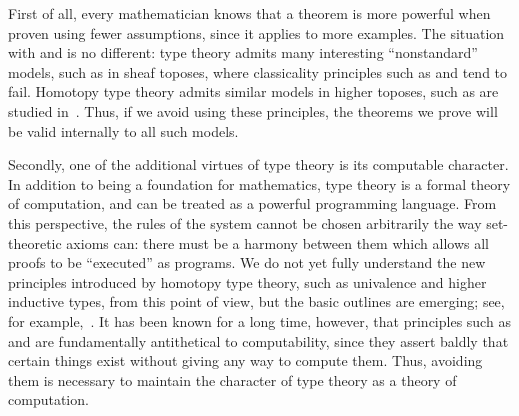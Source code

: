 First of all, every mathematician knows that a theorem is more powerful when proven using fewer assumptions, since it applies to more examples.
The situation with \choice{} and \LEM{} is no different:
type theory admits many interesting ``nonstandard'' models, such as in sheaf toposes, where classicality principles such as \choice{} and \LEM{} tend to fail.
Homotopy type theory admits similar models in higher toposes, such as are studied in~\citep{ToenVezzosi02,Rezk05,lurie:higher-topoi}.
Thus, if we avoid using these principles, the theorems we prove will be valid internally to all such models.

Secondly, one of the additional virtues of type theory is its computable character.
In addition to being a foundation for mathematics, type theory is a formal theory of computation, and can be treated as a powerful programming language.
%
From this perspective, the rules of the system cannot be chosen arbitrarily the way set-theoretic axioms can: there must be a harmony between them which allows all proofs to be ``executed'' as programs.
We do not yet fully understand the new principles introduced by homotopy type theory, such as univalence and higher inductive types, from
this point of view, but the basic outlines are emerging; see, for example,~\citep{lh:canonicity}.
It has been known for a long time, however, that principles such as \choice{} and \LEM{} are fundamentally antithetical to computability, since they assert baldly that certain things exist without giving any way to compute them.
Thus, avoiding them is necessary to maintain the character of type theory as a theory of computation.

